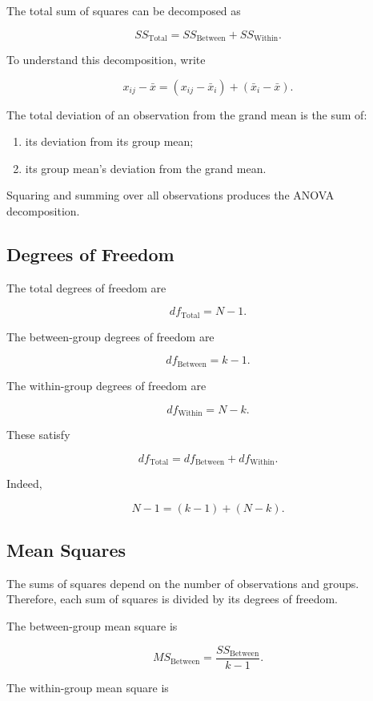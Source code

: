 \documentclass[11pt]{article}
\begin{document}
The total sum of squares can be decomposed as

\[
\boxed{
SS_{\mathrm{Total}}
=
SS_{\mathrm{Between}}
+
SS_{\mathrm{Within}}.
}
\]

To understand this decomposition, write

\[
x_{ij}-\bar{x}
=
(x_{ij}-\bar{x}_i)
+
(\bar{x}_i-\bar{x}).
\]

The total deviation of an observation from the grand mean is the sum of:

\begin{enumerate}[noitemsep]
    \item its deviation from its group mean;
    \item its group mean's deviation from the grand mean.
\end{enumerate}

Squaring and summing over all observations produces the ANOVA
decomposition.

\subsection{Degrees of Freedom}

The total degrees of freedom are

\[
\boxed{
df_{\mathrm{Total}}=N-1.
}
\]

The between-group degrees of freedom are

\[
\boxed{
df_{\mathrm{Between}}=k-1.
}
\]

The within-group degrees of freedom are

\[
\boxed{
df_{\mathrm{Within}}=N-k.
}
\]

These satisfy

\[
df_{\mathrm{Total}}
=
df_{\mathrm{Between}}
+
df_{\mathrm{Within}}.
\]

Indeed,

\[
N-1=(k-1)+(N-k).
\]

\subsection{Mean Squares}

The sums of squares depend on the number of observations and groups.
Therefore, each sum of squares is divided by its degrees of freedom.

The between-group mean square is

\[
\boxed{
MS_{\mathrm{Between}}
=
\frac{
SS_{\mathrm{Between}}
}{
k-1
}.
}
\]

The within-group mean square is
\end{document}
